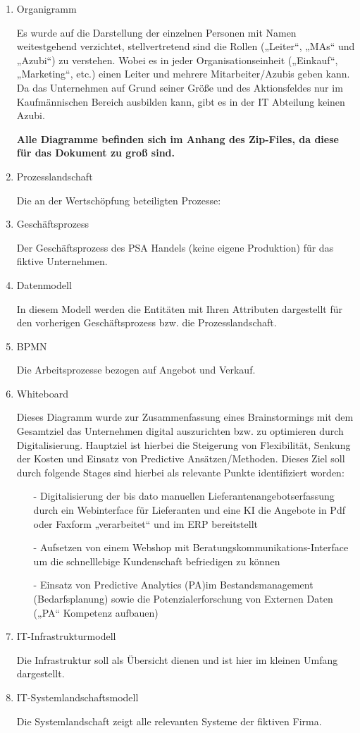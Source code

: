 \begin{enumerate}
\item Organigramm

Es wurde auf die Darstellung der einzelnen Personen mit Namen weitestgehend verzichtet, stellvertretend sind die Rollen („Leiter“, „MAs“ und „Azubi“) zu verstehen. Wobei es in jeder Organisationseinheit („Einkauf“, „Marketing“, etc.) einen Leiter und mehrere Mitarbeiter/Azubis geben kann. Da das Unternehmen auf Grund seiner Größe und des Aktionsfeldes nur im Kaufmännischen Bereich ausbilden kann, gibt es in der IT Abteilung keinen Azubi.

\textbf{Alle Diagramme befinden sich im Anhang des Zip-Files, da diese für das Dokument zu groß sind.}

\item Prozesslandschaft

Die an der Wertschöpfung beteiligten Prozesse: 

\item Geschäftsprozess

Der Geschäftsprozess des PSA Handels (keine eigene Produktion) für das fiktive Unternehmen.

\item Datenmodell

In diesem Modell werden die Entitäten mit Ihren Attributen dargestellt für den vorherigen Geschäftsprozess bzw. die Prozesslandschaft.

\item BPMN

Die Arbeitsprozesse bezogen auf Angebot und Verkauf. 

\item Whiteboard

Dieses Diagramm wurde zur Zusammenfassung eines Brainstormings mit dem Gesamtziel das Unternehmen digital auszurichten bzw. zu optimieren durch Digitalisierung. Hauptziel ist hierbei die Steigerung von Flexibilität, Senkung der Kosten und Einsatz von Predictive Ansätzen/Methoden. Dieses Ziel soll durch folgende Stages sind hierbei als relevante Punkte identifiziert worden:
\begin{itemize}
\item[-] Digitalisierung der bis dato manuellen Lieferantenangebotserfassung durch ein Webinterface für Lieferanten und eine KI die Angebote in Pdf oder Faxform „verarbeitet“ und im ERP bereitstellt
\item[-] Aufsetzen von einem Webshop mit Beratungskommunikations-Interface um die schnelllebige Kundenschaft befriedigen zu können
\item[-] Einsatz von Predictive Analytics (PA)im Bestandsmanagement (Bedarfsplanung) sowie die Potenzialerforschung von Externen Daten („PA“ Kompetenz aufbauen)
\end{itemize}

\item IT-Infrastrukturmodell

Die Infrastruktur soll als Übersicht dienen und ist hier im kleinen Umfang dargestellt.
\item IT-Systemlandschaftsmodell

Die Systemlandschaft zeigt alle relevanten Systeme der fiktiven Firma.
\end{enumerate}

